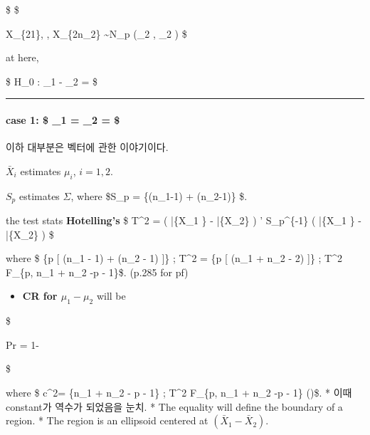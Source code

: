 \documentclass[
]{book}
\providecommand{\tightlist}{%
  \setlength{\itemsep}{0pt}\setlength{\parskip}{0pt}}
\begin{document}
{{{\$
\$

\pmb X\_\{21\}, \cdots, \pmb X\_\{2n\_2\} \sim N\_p (\pmb \mu\_2 , \Sigma\_2 )
\$

at here,

\$
H\_0 : \pmb \mu\_1 - \pmb \mu\_2 = 
\$

\begin{center}\rule{0.5\linewidth}{0.5pt}\end{center}

\hypertarget{case-1-_1-_2}{%
\paragraph{\texorpdfstring{case 1: \$ \Sigma\_1 = \Sigma\_2 = \Sigma \$}{case 1: \$ \_1 = \_2 = \$}}\label{case-1-_1-_2}}

이하 대부분은 벡터에 관한 이야기이다.

\(\bar X_i\) estimates \(\mu_i\), \(i=1,2\).

\(S_p\) estimates \(\Sigma\), where \$S\_p =  \{(n\_1-1) + (n\_2-1)\} \$.

the test stats \textbf{Hotelling's } \$ T\^{}2 =  \left( \bar \{X\_1 \} - \bar \{X\_2\} \right) ' S\_p\^{}\{-1\} \left( \bar \{X\_1 \} - \bar \{X\_2\} \right) \$

where \$  \{p {[} (n\_1 - 1) + (n\_2 - 1) {]}\} ; T\^{}2 =  \{p {[} (n\_1 + n\_2 - 2) {]}\} ; T\^{}2  F\_\{p, n\_1 + n\_2 -p - 1\}\$. (p.285 for pf)

\begin{itemize}
\tightlist
\item
  \textbf{CR for \(\mu_1 - \mu_2\)} will be
\end{itemize}

\$

Pr  = 1-\alpha

\$

where \$ c\^{}2=  \{n\_1 + n\_2 - p - 1\} ; T\^{}2  F\_\{p, n\_1 + n\_2 -p - 1\} (\alpha)\$.
* 이때 constant가 역수가 되었음을 눈치.
* The equality will define the boundary of a region.
* The region is an ellipsoid centered at \((\bar X_1 - \bar X_2)\).

}}}
\end{document}
